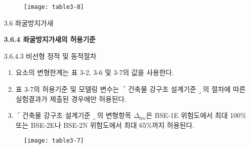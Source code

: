 	
	\begin{frame}
	\begin{figure}
		\centering
		\texttt{[image: table3-8]}
	\end{figure}
\end{frame}	
	
	
	
	
	\begin{frame}{3.6 좌굴방지가새}

	\textbf{3.6.4 좌굴방지가새의 허용기준}
	
3.6.4.3 비선형 정적 및 동적절차	

	\begin{enumerate}
		\item[(1)] 요소의 변형한계는 표 3-2, 3-6 및 3-7의 값을 사용한다.  
		\item[(2)] 표 3-7의 허용기준 및 모델링 변수는 $\ulcorner$건축물 강구조 설계기준$\lrcorner$의 절차에 따른 실험결과가 제출된 경우에만 허용된다. 
		\item[(3)] $\ulcorner$건축물 강구조 설계기준$\lrcorner$의 변형항목 $\Delta_{bm}$은 BSE-1E 위험도에서 최대 100\% 또는 BSE-2E나 BSE-2N 위험도에서 최대 65\%까지 허용된다. 
	\end{enumerate}
	\end{frame}	



\begin{frame}
	\begin{figure}
		\centering
		\texttt{[image: table3-7]}
	\end{figure}
\end{frame}	
